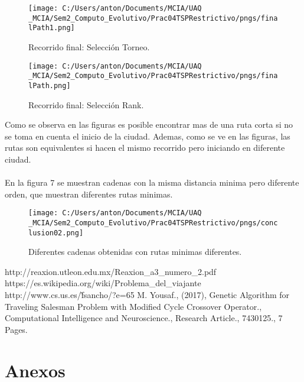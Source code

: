 \documentclass[10pt,letterpaper]{article}
\begin{document}
\begin{figure}[H]
	\centering
    \texttt{[image: C:/Users/anton/Documents/MCIA/UAQ \_MCIA/Sem2\_Computo\_Evolutivo/Prac04TSPRestrictivo/pngs/finalPath1.png]}
    \caption{Recorrido final: Selección Torneo.}
\end{figure}

\begin{figure}[H]
	\centering
    \texttt{[image: C:/Users/anton/Documents/MCIA/UAQ \_MCIA/Sem2\_Computo\_Evolutivo/Prac04TSPRestrictivo/pngs/finalPath.png]}
    \caption{Recorrido final: Selección Rank.}
\end{figure}

Como se observa en las figuras es posible encontrar mas de una ruta corta si no se toma en cuenta el inicio de la ciudad. Ademas, como se ve en las figuras, las rutas son equivalentes si hacen el mismo recorrido pero iniciando en diferente ciudad.
\\\\
En la figura 7 se muestran cadenas con la misma distancia minima pero diferente orden, que muestran diferentes rutas minimas.

\begin{figure}[H]
	\centering
    \texttt{[image: C:/Users/anton/Documents/MCIA/UAQ \_MCIA/Sem2\_Computo\_Evolutivo/Prac04TSPRestrictivo/pngs/conclusion02.png]}
    \caption{Diferentes cadenas obtenidas con rutas minimas diferentes.}
\end{figure}


\begin{thebibliography}{0}
	 http://reaxion.utleon.edu.mx/Reaxion\_a3\_numero\_2.pdf
	\bibitem{} https://es.wikipedia.org/wiki/Problema\_del\_viajante
	\bibitem{} http://www.cs.us.es/\~fsancho/?e=65
	\bibitem{} M. Yousaf., (2017), Genetic Algorithm for Traveling Salesman Problem with Modified Cycle Crossover Operator., Computational Intelligence and Neuroscience., Research Article., 7430125., 7 Pages.
\end  {thebibliography}

\section{Anexos}

\end{document}

